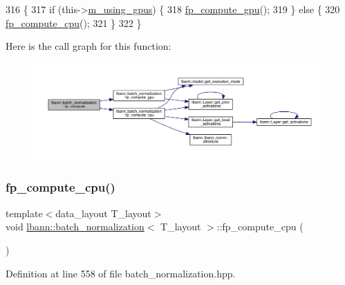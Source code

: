 \begin{DoxyCode}
316                              \{
317     \textcolor{keywordflow}{if} (this->\hyperlink{classlbann_1_1Layer_af7881cb5eff5207c15fa835d65462e8f}{m\_using\_gpus}) \{
318       \hyperlink{classlbann_1_1batch__normalization_aacff2c47a5455a4c28b9695f4fb37249}{fp\_compute\_gpu}();
319     \} \textcolor{keywordflow}{else} \{
320       \hyperlink{classlbann_1_1batch__normalization_ae4cad47f456752e4ea20add0f6f38819}{fp\_compute\_cpu}();
321     \}
322   \}
\end{DoxyCode}
Here is the call graph for this function\+:\nopagebreak
\begin{figure}[H]
\begin{center}
\leavevmode
\includegraphics[width=350pt]{classlbann_1_1batch__normalization_a92ad52396d7083c84ec20016ad5e994b_cgraph}
\end{center}
\end{figure}
\mbox{\label{classlbann_1_1batch__normalization_ae4cad47f456752e4ea20add0f6f38819}} 
\subsubsection{\texorpdfstring{fp\+\_\+compute\+\_\+cpu()}{fp\_compute\_cpu()}}
{\footnotesize\ttfamily template$<$data\+\_\+layout T\+\_\+layout$>$ \\
void \hyperlink{classlbann_1_1batch__normalization}{lbann\+::batch\+\_\+normalization}$<$ T\+\_\+layout $>$\+::fp\+\_\+compute\+\_\+cpu (\begin{DoxyParamCaption}{ }\end{DoxyParamCaption})\hspace{0.3cm}{\ttfamily [inline]}}



Definition at line 558 of file batch\+\_\+normalization.\+hpp.


